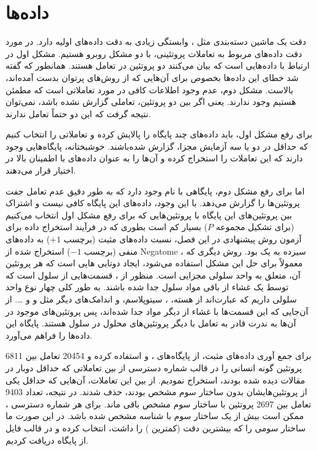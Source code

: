 \section{داده‌ها}
دقت یک ماشین دسته‌بندی مثل ، وابستگی زیادی به دقت داده‌های اولیه دارد. در مورد دقت داده‌های مربوط به تعاملات پروتئینی، با دو مشکل روبرو هستیم. مشکل اول در ارتباط با داده‌هایی است که بیان می‌کنند دو پروتئین در تعامل هستند. همانطور که گفته شد خطای این داده‌ها بخصوص برای آن‌هایی که از روش‌های پرتوان بدست آمده‌اند، بالاست. مشکل دوم، عدم وجود اطلاعات کافی در مورد تعاملاتی است که مطمئن هستیم وجود ندارند. یعنی اگر بین دو پروتئین، تعاملی گزارش نشده باشد، نمی‌توان نتیجه گرفت که این دو حتماً تعامل ندارند.

برای رفع مشکل اول، باید داده‌های چند پایگاه را پالایش کرده و تعاملاتی را انتخاب کنیم که حداقل در دو یا سه آزمایش مجزا، گزارش شده‌باشند. خوشبختانه، پایگاه‌هایی وجود دارند که این تعاملات را استخراج کرده و آن‌ها را به عنوان داده‌های با اطمینان بالا در اختیار قرار می‌دهند.

اما برای رفع مشکل دوم، پایگاهی با نام  وجود دارد که به طور دقیق عدم تعامل جفت پروتئین‌ها را گزارش می‌دهد. با این وجود، داده‌های این پایگاه کافی نیست و اشتراک بین پروتئین‌های این پایگاه با پروتئین‌هایی که برای رفع مشکل اول انتخاب می‌کنیم (برای تشکیل مجموعه $P$) بسیار کم است بطوری که در فرآیند استخراج داده برای آزمون روش پیشنهادی در این فصل، نسبت داده‌های مثبت (برچسب $+1$) به داده‌های منفی (برچسب $-1$) استخراج شده از Negatome ، سیزده به یک بود. روش دیگری که معمولاً برای حل این مشکل استفاده می‌شود، ایجاد دوتایی هایی است که هر پروتئین آن، متعلق به واحد سلولی مجزایی است. منظور از ، قسمت‌هایی از سلول است که توسط یک غشاء از باقی مواد سلول جدا شده باشند. به طور کلی چهار نوع واحد سلولی داریم که عبارت‌اند از هسته، ، سیتوپلاسم، و اندامک‌های دیگر مثل  و  و \ldots . از آن‌جایی که این قسمت‌ها با غشاء از دیگر مواد جدا شده‌اند، پس پروتئین‌های موجود در آن‌ها به ندرت قادر به تعامل با دیگر پروتئین‌های محلول در سلول هستند. پایگاه  این داده‌ها را فراهم می‌آورد.

برای جمع آوری داده‌های مثبت، از پایگاه‌های ،  و  استفاده کرده و 20454 تعامل بین 6811 پروتئین گونه انسانی را در قالب شماره دسترسی  از بین تعاملاتی که حداقل دوبار در مقالات دیده شده بودند، استخراج نمودیم. از بین این تعاملات، آن‌هایی که حداقل یکی از پروتئین‌هایشان بدون ساختار سوم مشخص بودند، حذف شدند. در نتیجه، تعداد 9403 تعامل بین 2697 پروتئین با ساختار سوم مشخص باقی ماند. برای هر شماره دسترسی ، ممکن است بیش از یک ساختار سوم با شناسه  مشخص شده باشد. در این صورت ما ساختار سومی را که بیشترین دقت (کمترین ) را داشت، انتخاب کرده و در قالب فایل  از پایگاه  دریافت کردیم.

